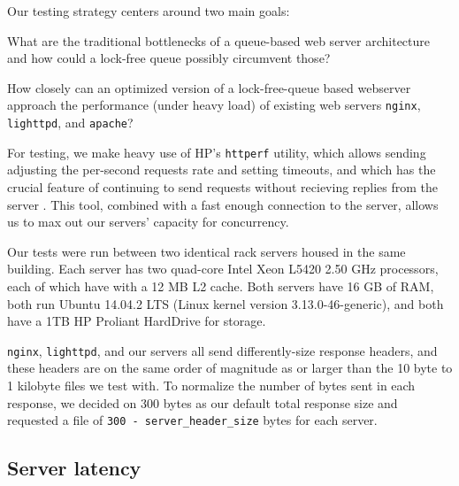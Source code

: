 \documentclass[twoside,10pt]{article}
\begin{document}
\begin{multicols}{2}
Our testing strategy centers around two main goals:

\begin{compactitem}
\item What are the traditional bottlenecks of a queue-based web server
  architecture and how could a lock-free queue possibly circumvent
  those?
\item How closely can an optimized version of a lock-free-queue based
  webserver approach the performance (under heavy load) of existing
  web servers \verb+nginx+, \verb+lighttpd+, and \verb+apache+?
\end{compactitem}

For testing, we make heavy use of HP's \verb+httperf+ utility, which
allows sending adjusting the per-second requests rate and setting
timeouts, and which has the crucial feature of continuing to send
requests without recieving replies from the server
\cite{mosberger1998httperf}. This tool, combined with a fast enough
connection to the server, allows us to max out our servers' capacity
for concurrency.

Our tests were run between two identical rack servers housed in the
same building. Each server has two quad-core Intel Xeon L5420 2.50 GHz
processors, each of which have with a 12 MB L2 cache. Both servers
have 16 GB of RAM, both run Ubuntu 14.04.2 LTS (Linux kernel version
3.13.0-46-generic), and both have a 1TB HP Proliant HardDrive for
storage.

\verb+nginx+, \verb+lighttpd+, and our servers all send
differently-size response headers, and these headers are on the same
order of magnitude as or larger than the 10 byte to 1 kilobyte files
we test with. To normalize the number of bytes sent in each response,
we decided on 300 bytes as our default total response size and
requested a file of \verb+300 - server_header_size+ bytes for each
server.

\subsection{Server latency}


\end{multicols}
\end{document}
